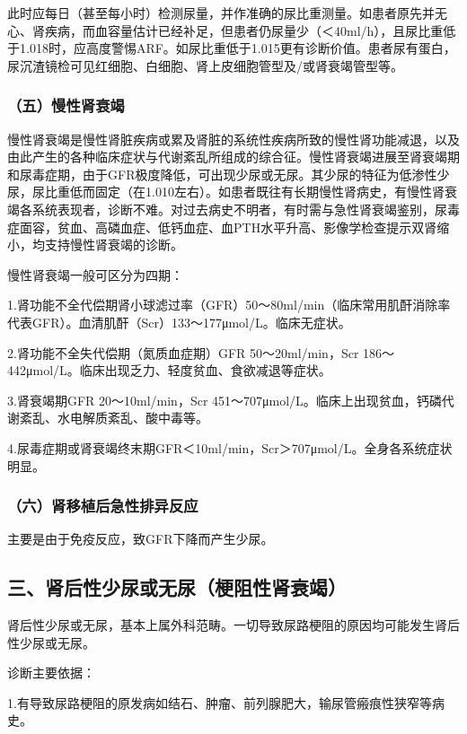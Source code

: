 此时应每日（甚至每小时）检测尿量，并作准确的尿比重测量。如患者原先并无心、肾疾病，而血容量估计已经补足，但患者仍尿量少（＜40ml/h），且尿比重低于1.018时，应高度警惕ARF。如尿比重低于1.015更有诊断价值。患者尿有蛋白，尿沉渣镜检可见红细胞、白细胞、肾上皮细胞管型及/或肾衰竭管型等。

\subsubsection{（五）慢性肾衰竭}

慢性肾衰竭是慢性肾脏疾病或累及肾脏的系统性疾病所致的慢性肾功能减退，以及由此产生的各种临床症状与代谢紊乱所组成的综合征。慢性肾衰竭进展至肾衰竭期和尿毒症期，由于GFR极度降低，可出现少尿或无尿。其少尿的特征为低渗性少尿，尿比重低而固定（在1.010左右）。如患者既往有长期慢性肾病史，有慢性肾衰竭各系统表现者，诊断不难。对过去病史不明者，有时需与急性肾衰竭鉴别，尿毒症面容，贫血、高磷血症、低钙血症、血PTH水平升高、影像学检查提示双肾缩小，均支持慢性肾衰竭的诊断。

慢性肾衰竭一般可区分为四期：

1.肾功能不全代偿期肾小球滤过率（GFR）50～80ml/min（临床常用肌酐消除率代表GFR）。血清肌酐（Scr）133～177μmol/L。临床无症状。

2.肾功能不全失代偿期（氮质血症期）GFR 50～20ml/min，Scr
186～442μmol/L。临床出现乏力、轻度贫血、食欲减退等症状。

3.肾衰竭期GFR 20～10ml/min，Scr
451～707μmol/L。临床上出现贫血，钙磷代谢紊乱、水电解质紊乱、酸中毒等。

4.尿毒症期或肾衰竭终末期GFR＜10ml/min，Scr＞707μmol/L。全身各系统症状明显。

\subsubsection{（六）肾移植后急性排异反应}

主要是由于免疫反应，致GFR下降而产生少尿。

\protect\hypertarget{text00272.html}{}{}

\subsection{三、肾后性少尿或无尿（梗阻性肾衰竭）}

肾后性少尿或无尿，基本上属外科范畴。一切导致尿路梗阻的原因均可能发生肾后性少尿或无尿。

诊断主要依据：

1.有导致尿路梗阻的原发病如结石、肿瘤、前列腺肥大，输尿管瘢痕性狭窄等病史。

